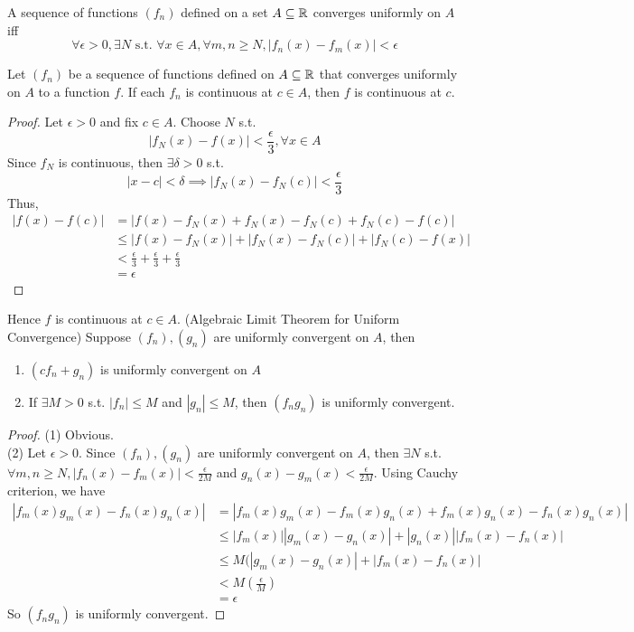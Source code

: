\documentclass[11pt]{article}
\begin{document}
A sequence of functions $(f_n)$ defined on a set $A \subseteq \mathbb{R}$ converges uniformly on $A$ iff
$$\forall \epsilon > 0, \exists N \text{ s.t. } \forall x \in A, \forall m,n \geq N, |f_n(x) - f_m(x)| < \epsilon$$

 Let $(f_n)$ be a sequence of functions defined on $A \subseteq \mathbb{R}$ that converges uniformly on $A$ to a function $f$. If each $f_n$ is continuous at $c \in A$, then $f$ is continuous at $c$.
\begin{proof}
	Let $\epsilon >0$ and fix $c \in A$. Choose $N$ s.t.
	$$|f_N(x) - f(x)| < \frac{\epsilon}{3}, \forall x \in A$$
	Since $f_N$ is continuous, then $\exists \delta > 0$ s.t.
	$$|x - c| < \delta \implies |f_N(x) - f_N(c)| < \frac{\epsilon}{3}$$
	Thus,
	\begin{align*}
		|f(x) - f(c) | &= |f(x) - f_N(x) + f_N(x) - f_N(c) + f_N(c) - f(c)|\\
		&\leq |f(x) - f_N(x)| + |f_N(x) - f_N(c)| + |f_N(c) - f(x)|\\
		&< \frac{\epsilon}{3} + \frac{\epsilon}{3} + \frac{\epsilon}{3} \\
		&= \epsilon
	\end{align*}
\end{proof}
Hence $f$ is continuous at $c \in A$.
\property (Algebraic Limit Theorem for Uniform Convergence) Suppose $(f_n), (g_n)$ are uniformly convergent on $A$, then
\begin{enumerate}
	\item $(cf_n + g_n)$ is uniformly convergent on $A$
	\item If $\exists M > 0$ s.t. $|f_n| \leq M$ and $|g_n| \leq M$, then $(f_ng_n)$ is uniformly convergent.
\end{enumerate}
\begin{proof}
(1) Obvious.\\
(2) Let $\epsilon > 0$. Since $(f_n), (g_n)$ are uniformly convergent on $A$, then $\exists N$ s.t. $\forall m, n \geq N, |f_n(x) - f_m(x)| < \frac{\epsilon}{2M}$ and $g_n(x) - g_m(x) < \frac{\epsilon}{2M}$. Using Cauchy criterion, we have
\begin{align*}
	|f_m(x)g_m(x) - f_n(x)g_n(x)| &= |f_m(x)g_m(x) -f_m(x)g_n(x) + f_m(x)g_n(x) - f_n(x)g_n(x)| \\
	&\leq |f_m(x)||g_m(x)-g_n(x)| + |g_n(x)||f_m(x) - f_n(x)|\\
	&\leq M(|g_m(x) - g_n(x)| + |f_m(x) - f_n(x)| \\
	&< M(\frac{\epsilon}{M}) \\
	&= \epsilon
\end{align*}
So $(f_ng_n)$ is uniformly convergent.
\end{proof}
\end{document}
